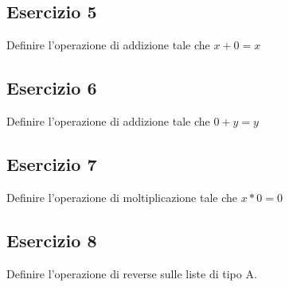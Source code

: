 \subsection{Esercizio 5}
\begin{thm}
	Definire l'operazione di addizione tale che $x + 0 = x$
\end{thm}


\subsection{Esercizio 6}
\begin{thm}
	Definire l'operazione di addizione tale che $0 + y = y$
\end{thm}


\subsection{Esercizio 7}
\begin{thm}
	Definire l'operazione di moltiplicazione tale che $x * 0 = 0$
\end{thm}


\subsection{Esercizio 8}
\begin{thm}
	Definire l'operazione di reverse sulle liste di tipo A.
\end{thm}
